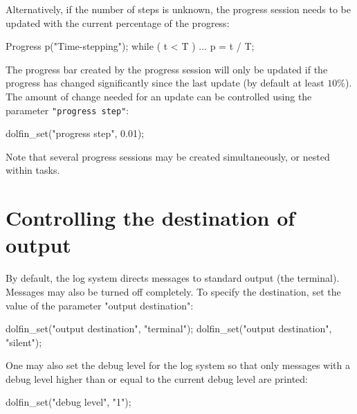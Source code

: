 Alternatively, if the number of steps is unknown, the progress session
needs to be updated with the current percentage of the progress:
\begin{code}
Progress p("Time-stepping");
while ( t < T )
{
  ...
  p = t / T;
}
\end{code}

The progress bar created by the progress session will only be updated
if the progress has changed significantly since the last update (by
default at least $10\%$). The
amount of change needed for an update can be controlled using the
parameter \texttt{"progress step"}:
\begin{code}
dolfin_set("progress step", 0.01);
\end{code}

Note that several progress sessions may be created simultaneously, or
nested within tasks.

\section{Controlling the destination of output}

By default, the \dolfin{} log system directs messages to standard
output (the terminal). Messages may also be turned off completely.
To specify the destination, set the value of the parameter "output destination":
\begin{code}
dolfin_set("output destination", "terminal");
dolfin_set("output destination", "silent");
\end{code}

One may also set the debug level for the \dolfin{} log system so that
only messages with a debug level higher than or equal to the current
debug level are printed:
\begin{code}
dolfin_set("debug level", "1");
\end{code}
